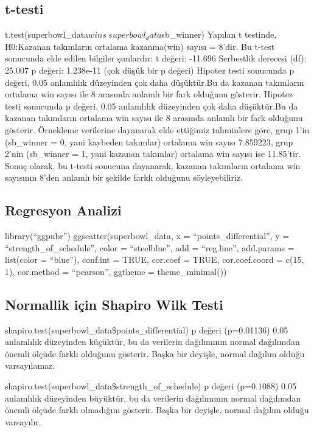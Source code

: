 \documentclass[
  12pt,
]{article}
\begin{document}
\hypertarget{t-testi}{%
\subsection{t-testi}\label{t-testi}}

t.test(superbowl\_data\(wins~ superbowl_data\)sb\_winner)
Yapılan t testinde,
H0:Kazanan takımların ortalama kazanma(win) sayısı = 8'dir.
Bu t-test sonucunda elde edilen bilgiler şunlardır:
t değeri: -11.696
Serbestlik derecesi (df): 25.007
p değeri: 1.238e-11 (çok düşük bir p değeri)
Hipotez testi sonucunda p değeri, 0.05 anlamlılık düzeyinden çok daha düşüktür.Bu da kazanan takımların ortalama win sayısı ile 8 arasında anlamlı bir fark olduğunu gösterir.
Hipotez testi sonucunda p değeri, 0.05 anlamlılık düzeyinden çok daha düşüktür.Bu da kazanan takımların ortalama win sayısı ile 8 arasında anlamlı bir fark olduğunu gösterir.
Örnekleme verilerine dayanarak elde ettiğimiz tahminlere göre, grup 1'in (sb\_winner = 0, yani kaybeden takımlar) ortalama win sayısı 7.859223, grup 2'nin (sb\_winner = 1, yani kazanan takımlar) ortalama win sayısı ise 11.85'tir.
Sonuç olarak, bu t-testi sonucuna dayanarak, kazanan takımların ortalama win sayısının 8'den anlamlı bir şekilde farklı olduğunu söyleyebiliriz.

\hypertarget{regresyon-analizi}{%
\subsection{Regresyon Analizi}\label{regresyon-analizi}}

library(``ggpubr'')
ggscatter(superbowl\_data,
x = ``points\_differential'',
y = ``strength\_of\_schedule'',
color = ``steelblue'',
add = ``reg.line'',
add.params = list(color = ``blue''),
conf.int = TRUE,
cor.coef = TRUE,
cor.coef.coord = c(15, 1),
cor.method = ``pearson'',
ggtheme = theme\_minimal())

\hypertarget{normallik-iuxe7in-shapiro-wilk-testi-1}{%
\subsection{Normallik için Shapiro Wilk Testi}\label{normallik-iuxe7in-shapiro-wilk-testi-1}}

shapiro.test(superbowl\_data\$points\_differential)
p değeri (p=0.01136) 0.05 anlamlılık düzeyinden küçüktür, bu da verilerin dağılımının normal dağılımdan önemli ölçüde farklı olduğunu gösterir.
Başka bir deyişle, normal dağılım olduğu varsayılamaz.

shapiro.test(superbowl\_data\$strength\_of\_schedule)
p değeri (p=0.1088) 0.05 anlamlılık düzeyinden büyüktür, bu da verilerin dağılımının normal dağılımdan önemli ölçüde farklı olmadığını gösterir.
Başka bir deyişle, normal dağılım olduğu varsayılır.
\end{document}
